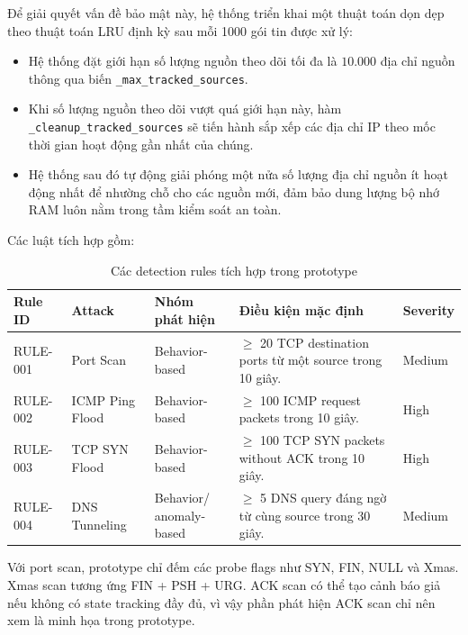 Để giải quyết vấn đề bảo mật này, hệ thống triển khai một thuật toán dọn dẹp theo thuật toán LRU định kỳ sau mỗi 1000 gói tin được xử lý:
\begin{itemize}
    \item Hệ thống đặt giới hạn số lượng nguồn theo dõi tối đa là $10.000$ địa chỉ nguồn thông qua biến \texttt{\_max\_tracked\_sources}.
    \item Khi số lượng nguồn theo dõi vượt quá giới hạn này, hàm \texttt{\_cleanup\_tracked\_sources} sẽ tiến hành sắp xếp các địa chỉ IP theo mốc thời gian hoạt động gần nhất của chúng.
    \item Hệ thống sau đó tự động giải phóng một nửa số lượng địa chỉ nguồn ít hoạt động nhất để nhường chỗ cho các nguồn mới, đảm bảo dung lượng bộ nhớ RAM luôn nằm trong tầm kiểm soát an toàn.
\end{itemize}

Các luật tích hợp gồm:

\begin{table}[H]
    \centering
    \scriptsize
    \renewcommand{\arraystretch}{1.3}
    \begin{tabular}{|>{\raggedright\arraybackslash}p{1.5cm}|>{\raggedright\arraybackslash}p{2.5cm}|>{\raggedright\arraybackslash}p{2.5cm}|>{\raggedright\arraybackslash}p{4.9cm}|>{\raggedright\arraybackslash}p{1.3cm}|}
        \hline
        \textbf{Rule ID} & \textbf{Attack} & \textbf{Nhóm phát hiện} & \textbf{Điều kiện mặc định} & \textbf{Severity} \\ \hline
        RULE-001 & Port Scan & Behavior-based & $\geq$ 20 TCP destination ports từ một source trong 10 giây. & Medium \\ \hline
        RULE-002 & ICMP Ping Flood & Behavior-based & $\geq$ 100 ICMP request packets trong 10 giây. & High \\ \hline
        RULE-003 & TCP SYN Flood & Behavior-based & $\geq$ 100 TCP SYN packets without ACK trong 10 giây. & High \\ \hline
        RULE-004 & DNS Tunneling & \makecell[l]{Behavior/\\anomaly-based} & $\geq$ 5 DNS query đáng ngờ từ cùng source trong 30 giây. & Medium \\ \hline
    \end{tabular}
    \caption{Các detection rules tích hợp trong prototype}
\end{table}

Với port scan, prototype chỉ đếm các probe flags như SYN, FIN, NULL và Xmas. Xmas scan tương ứng FIN + PSH + URG. ACK scan có thể tạo cảnh báo giả nếu không có state tracking đầy đủ, vì vậy phần phát hiện ACK scan chỉ nên xem là minh họa trong prototype.

